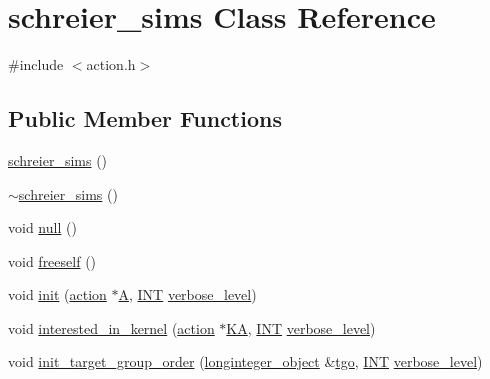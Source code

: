 \hypertarget{classschreier__sims}{}\section{schreier\+\_\+sims Class Reference}
\label{classschreier__sims}


{\ttfamily \#include $<$action.\+h$>$}

\subsection*{Public Member Functions}
\begin{DoxyCompactItemize}
\item 
\mbox{\hyperlink{classschreier__sims_adf64ea1ff0b44a980b7fa5a3ddd9f2db}{schreier\+\_\+sims}} ()
\item 
\mbox{\hyperlink{classschreier__sims_a1b5c79f11ed6b9f0e7a7fe5f4d2f6baf}{$\sim$schreier\+\_\+sims}} ()
\item 
void \mbox{\hyperlink{classschreier__sims_a395d07da6c3092bba6c4b3c43a5d84f0}{null}} ()
\item 
void \mbox{\hyperlink{classschreier__sims_ad3d72b681146b81d506f5e23048a0bff}{freeself}} ()
\item 
void \mbox{\hyperlink{classschreier__sims_a360464a9d986401870264e415f132c67}{init}} (\mbox{\hyperlink{classaction}{action}} $\ast$\mbox{\hyperlink{simeon_8_c_a97833f04c3a9c008df5521a2fc291bb4}{A}}, \mbox{\hyperlink{galois_8h_a09fddde158a3a20bd2dcadb609de11dc}{I\+NT}} \mbox{\hyperlink{simeon_8_c_a818073fbcc2f439e7c56952f67386122}{verbose\+\_\+level}})
\item 
void \mbox{\hyperlink{classschreier__sims_ae16c57c3e24bb0c2d2d5c8d8e73e4b95}{interested\+\_\+in\+\_\+kernel}} (\mbox{\hyperlink{classaction}{action}} $\ast$\mbox{\hyperlink{classschreier__sims_a4de4f2f51ed18ce36dbcbaf1b8ab794f}{KA}}, \mbox{\hyperlink{galois_8h_a09fddde158a3a20bd2dcadb609de11dc}{I\+NT}} \mbox{\hyperlink{simeon_8_c_a818073fbcc2f439e7c56952f67386122}{verbose\+\_\+level}})
\item 
void \mbox{\hyperlink{classschreier__sims_af495ce69982ff0d5ceb09b40db328f60}{init\+\_\+target\+\_\+group\+\_\+order}} (\mbox{\hyperlink{classlonginteger__object}{longinteger\+\_\+object}} \&\mbox{\hyperlink{classschreier__sims_ab817cde1a270fbb3fef176d433b4b090}{tgo}}, \mbox{\hyperlink{galois_8h_a09fddde158a3a20bd2dcadb609de11dc}{I\+NT}} \mbox{\hyperlink{simeon_8_c_a818073fbcc2f439e7c56952f67386122}{verbose\+\_\+level}})
\item 

\end{DoxyCompactItemize}

